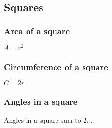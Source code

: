 
\subsection{Squares}

\subsubsection{Area of a square}

\(A=r^2\)

\subsubsection{Circumference of a square}

\(C=2r\)

\subsubsection{Angles in a square}

Angles in a square sum to \(2\pi \).

